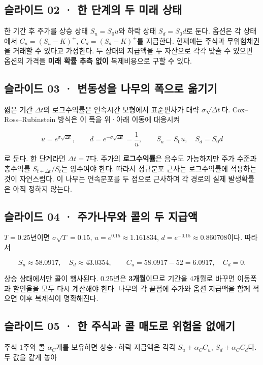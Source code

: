 \documentclass[11pt,a4paper]{article}
\begin{document}
\subsection{슬라이드 02 · 한 단계의 두 미래 상태}
한 기간 후 주가를 상승 상태 $S_u=S_0u$와 하락 상태 $S_d=S_0d$로 둔다. 옵션은 각 상태에서 $C_u=(S_u-K)^+$, $C_d=(S_d-K)^+$를 지급한다. 현재에는 주식과 무위험채권을 거래할 수 있다고 가정한다. 두 상태의 지급액을 두 자산으로 각각 맞출 수 있으면 옵션의 가격을 \textbf{미래 확률 추측 없이} 복제비용으로 구할 수 있다.\par

\subsection{슬라이드 03 · 변동성을 나무의 폭으로 옮기기}
짧은 기간 $\Delta t$의 로그수익률은 연속시간 모형에서 표준편차가 대략 $\sigma\sqrt{\Delta t}$다. Cox–Ross–Rubinstein 방식은 이 폭을 위·아래 이동에 대응시켜\par

\[
u=e^{\sigma\sqrt{\Delta t}},\qquad
d=e^{-\sigma\sqrt{\Delta t}}=\frac1u,\qquad
S_u=S_0u,\quad S_d=S_0d
\]

로 둔다. 한 단계라면 $\Delta t=T$다. 주가의 \textbf{로그수익률}은 음수도 가능하지만 주가 수준과 총수익률 $S_{t+\Delta t}/S_t$는 양수여야 한다. 따라서 정규분포 근사는 로그수익률에 적용하는 것이 자연스럽다. 이 나무는 연속분포를 두 점으로 근사하며 각 경로의 실제 발생확률은 아직 정하지 않는다.\par

\subsection{슬라이드 04 · 주가나무와 콜의 두 지급액}
$T=0.25$년이면 $\sigma\sqrt T=0.15$, $u=e^{0.15}\approx1.161834$, $d=e^{-0.15}\approx0.860708$이다. 따라서\par

\[
S_u\approx58.0917,\quad S_d\approx43.0354,\qquad
C_u=58.0917-52=6.0917,\quad C_d=0.
\]

상승 상태에서만 콜이 행사된다. 0.25년은 \textbf{3개월}이므로 기간을 4개월로 바꾸면 이동폭과 할인율을 모두 다시 계산해야 한다. 나무의 각 끝점에 주가와 옵션 지급액을 함께 적으면 이후 복제식이 명확해진다.\par

\subsection{슬라이드 05 · 한 주식과 콜 매도로 위험을 없애기}
주식 1주와 콜 $\alpha_C$개를 보유하면 상승·하락 지급액은 각각 $S_u+\alpha_CC_u$, $S_d+\alpha_CC_d$다. 두 값을 같게 놓아\par
\end{document}
